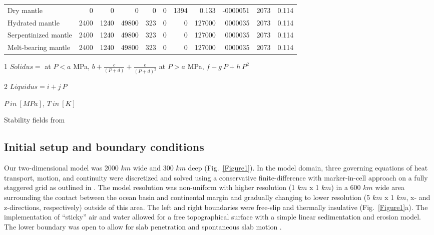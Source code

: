 \documentclass[draft]{agujournal2019}
\begin{document}
\begin{table}
\begin{threeparttable}
\begin{tabularx}{\textwidth}{L{3} R{0.75} R{0.75} R{0.75} R{0.75} R{0.75} R{0.75} R{0.75} R{1.25} R{0.75} R{0.75}}
   Dry mantle                & 0                                         & 0                                          & 0     & 0   & 0        & 1394 & 0.133  & -0000051 & 2073 & 0.114 \\

   Hydrated mantle           & 2400                                      & 1240                                       & 49800 & 323 & 0        & 0    & 127000 & 0000035  & 2073 & 0.114 \\

   Serpentinized mantle      & 2400                                      & 1240                                       & 49800 & 323 & 0        & 0    & 127000 & 0000035  & 2073 & 0.114 \\

   Melt-bearing mantle       & 2400                                      & 1240                                       & 49800 & 323 & 0        & 0    & 127000 & 0000035  & 2073 & 0.114 \\

   \midrule

   \bottomrule
  \end{tabularx}
  \begin{tablenotes}
   \footnotesize
   \item[1] $Solidus =$ at $P<a$ MPa, $b+\frac{c}{(P+d)}+\frac{e}{(P+d)^2}$ at $P>a$ MPa, $f+g~P+h~P^2$
   \item[2] $Liquidus = i+j~P$
   \item $P~in~[MPa]$, $T~in~[K]$
   \item Stability fields from 
  \end{tablenotes}
 \end{threeparttable}
\end{table}

\subsection{Initial setup and boundary conditions}
Our two-dimensional model was 2000 $km$ wide and 300 $km$ deep (Fig.~\ref{Figure1}). In the model domain, three governing equations of heat transport, motion, and continuity were discretized and solved using a conservative finite-difference with marker-in-cell approach on a fully staggered grid as outlined in . The model resolution was non-uniform with higher resolution (1 $km$ x 1 $km$) in a 600 $km$ wide area surrounding the contact between the ocean basin and continental margin and gradually changing to lower resolution (5 $km$ x 1 $km$, x- and z-directions, respectively) outside of this area. The left and right boundaries were free-slip and thermally insulative (Fig.~\ref{Figure1}a). The implementation of “sticky” air and water allowed for a free topographical surface with a simple linear sedimentation and erosion model. The lower boundary was open to allow for slab penetration and spontaneous slab motion \cite{Burg2005}.
\end{document}
